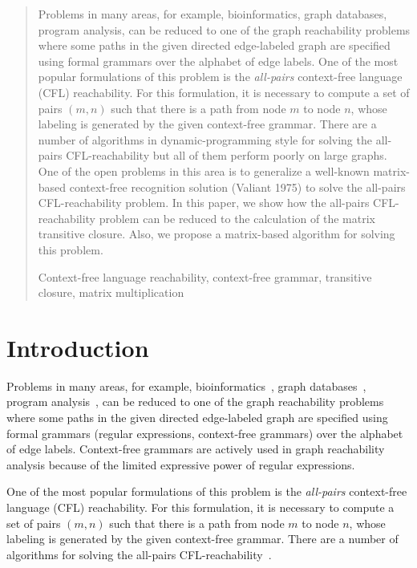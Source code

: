 \documentclass[runningheads,a4paper]{llncs}
\newcommand{\keywords}[1]{\par\addvspace\baselineskip
\noindent\keywordname\enspace\ignorespaces#1}
\begin{document}
\begin{abstract}
	Problems in many areas, for example, bioinformatics, graph databases, program analysis, can be reduced to one of the graph reachability problems where some paths in the given directed edge-labeled graph are specified using formal grammars over the alphabet of edge labels. One of the most popular formulations of this problem is the \textit{all-pairs} context-free language (CFL) reachability. For this formulation, it is necessary to compute a set of pairs $(m, n)$ such that there is a path from node $m$ to node $n$, whose labeling is generated by the given context-free grammar. There are a number of algorithms in dynamic-programming style for solving the all-pairs CFL-reachability but all of them perform poorly on large graphs. One of the open problems in this area is to generalize a well-known matrix-based context-free recognition solution (Valiant 1975) to solve the all-pairs CFL-reachability problem. In this paper, we show how the all-pairs CFL-reachability problem can be reduced to the calculation of the matrix transitive closure. Also, we propose a matrix-based algorithm for solving this problem.

\keywords{Context-free language reachability, context-free grammar, transitive closure, matrix multiplication}
\end{abstract}


\section{Introduction}%
Problems in many areas, for example, bioinformatics~\cite{Bio}, graph databases~\cite{graphDB}, program analysis~\cite{zhang2017context}, can be reduced to one of the graph reachability problems where some paths in the given directed edge-labeled graph are specified using formal grammars (regular expressions, context-free grammars) over the alphabet of edge labels. Context-free grammars are actively used in graph reachability analysis because of the limited expressive power of regular expressions.

One of the most popular formulations of this problem is the \textit{all-pairs} context-free language (CFL) reachability. For this formulation, it is necessary to compute a set of pairs $(m, n)$ such that there is a path from node $m$ to node $n$, whose labeling is generated by the given context-free grammar. There are a number of algorithms for solving the all-pairs CFL-reachability~\cite{GLL,hellingsRelational,RDF,GraphQueryWithEarley}.
\end{document}
